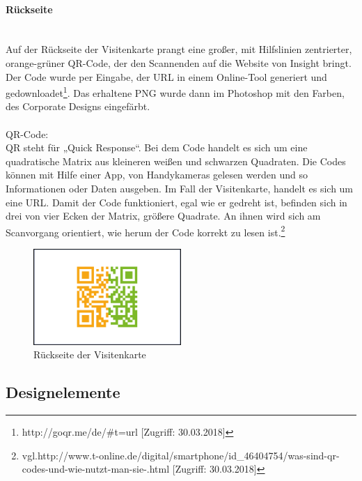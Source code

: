 \paragraph{Rückseite}
\leavevmode \\
Auf der Rückseite der Visitenkarte prangt eine großer, mit Hilfslinien zentrierter, orange-grüner QR-Code, der den Scannenden auf die Website von Insight bringt. Der Code wurde per Eingabe, der URL in einem Online-Tool generiert und gedownloadet\footnote{\label{} http://goqr.me/de/\#t=url [Zugriff: 30.03.2018]}. Das erhaltene PNG wurde dann im Photoshop mit den Farben, des Corporate Designs eingefärbt.
\leavevmode \\
\leavevmode \\
QR-Code:  
\leavevmode \\
QR steht für „Quick Response“. Bei dem Code handelt es sich um eine quadratische Matrix aus kleineren weißen und schwarzen Quadraten. Die Codes können mit Hilfe einer App, von Handykameras gelesen werden und so Informationen oder Daten ausgeben. Im Fall der Visitenkarte, handelt es sich um eine URL. Damit der Code funktioniert, egal wie er gedreht ist, befinden sich in drei von vier Ecken der Matrix, größere Quadrate. An ihnen wird sich am Scanvorgang orientiert, wie herum der Code korrekt zu lesen ist.\footnote{\label{} vgl.http://www.t-online.de/digital/smartphone/id\_46404754/was-sind-qr-codes-und-wie-nutzt-man-sie-.html [Zugriff: 30.03.2018]}

\begin{figure}[H] 
  \centering
     \includegraphics[width=0.5\textwidth]{design_abb7.png}
  \caption{Rückseite der Visitenkarte}
\end{figure}

\subsection{Designelemente}
